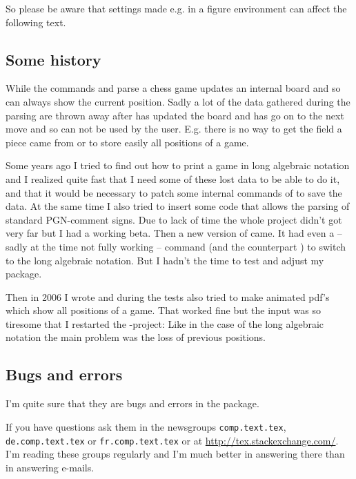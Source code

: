 \documentclass[pagesize,parskip=half-,fontsize=12pt]{scrartcl}
\begin{document}
So please be aware that settings made e.g. in a figure environment
can affect the following text.


\subsection{Some history}

While the commands  and  parse a chess
game \skaksty updates an internal board and so can always show the
current position. Sadly a lot of the data gathered during the
parsing are thrown away after  has updated the
board and  has go on to the next move and so can not be used by the
user. E.g. there is no way to get the field a piece came from or to
store easily all positions of a game.

Some years ago I tried to find out how to print a game in long
algebraic notation and I realized quite fast that I need some of
these lost data to be able to do it, and that it would be necessary
to patch some internal commands of \skaksty to save the data. At the
same time I also tried to insert some code that allows the parsing of
standard PGN-comment signs. Due to lack of time the whole project
didn't got very far but I had a working beta. Then a new version of
\skaksty came. It had even a -- sadly at the time not fully working -- command %
(and the counterpart ) to switch to the long algebraic
notation. But I hadn't the time to test and adjust my package.


Then in 2006 I wrote \pchessboard and during the tests also tried to
make animated pdf's which show all positions of a game. That worked
fine but the input was so tiresome that I restarted the
-project: Like in the case of the long algebraic
notation the main problem was the loss of previous positions.


\subsection{Bugs and errors}

I'm quite sure that they are bugs and errors in the package.

If you have questions ask them in the newsgroups
\nolinkurl{comp.text.tex}, \nolinkurl{de.comp.text.tex} or
\nolinkurl{fr.comp.text.tex} or at \url{http://tex.stackexchange.com/}. 
I'm reading these groups regularly and
I'm much better in answering there than in answering e-mails.
\end{document}

